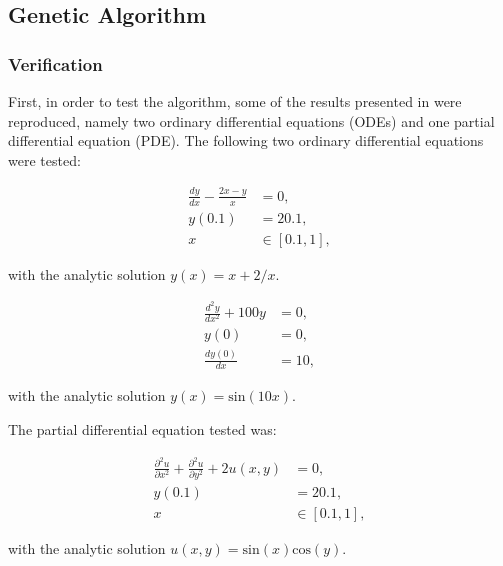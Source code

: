 \documentclass[multicolumn, 9pt]{extarticle}
\begin{document}
\subsection{Genetic Algorithm}
\subsubsection{Verification}
First, in order to test the algorithm, some of the results presented in \cite{Lagaris} were reproduced, namely two ordinary differential equations (ODEs) and one partial differential equation (PDE). The following two ordinary differential equations were tested:

\begin{align*}
	\frac{dy}{dx}  - \frac{2x - y}{x} &= 0, \\
	y(0.1) &= 20.1,                         \\
	x &\in [0.1, 1],
\end{align*}

with the analytic solution $y(x) = x + 2/x$.

\begin{equation}
\begin{aligned}
	\label{eq:ODE}
	\frac{d^{2}y}{dx^{2}}  + 100y &= 0, \\
	y(0) &= 0,                          \\
	\frac{dy(0)}{dx} &= 10,
\end{aligned}
\end{equation}

with the analytic solution $y(x) = \text{sin}(10x)$.

The partial differential equation tested was:

\begin{equation}
\begin{aligned}
	\label{eq:PDE}
	\frac{\partial^{2}u}{\partial x^{2}} + \frac{\partial^{2}u}{\partial y^{2}} + 2u(x, y) &= 0, \\
	y(0.1) &= 20.1,                                                                              \\
	x &\in [0.1, 1],
\end{aligned}
\end{equation}

with the analytic solution $u(x, y) = \text{sin}(x)\text{cos}(y)$.
\end{document}
